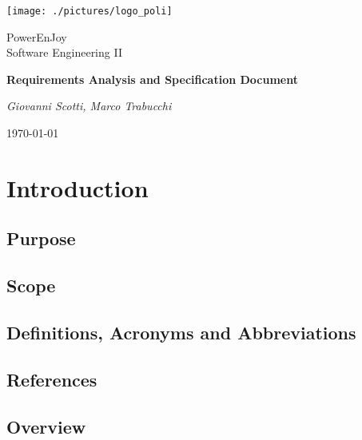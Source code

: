 \documentclass[a4paper,12pt]{report}
\begin{document}
\begin{titlepage}
\centering
\texttt{[image: ./pictures/logo\_poli]}\par
	\vspace{1.5cm}
	{\Large {PowerEnJoy \\ 
		Software Engineering II} \par}
	\vspace{1.5cm}
	{\LARGE \textbf{Requirements Analysis and Specification Document} \par}
	\vspace{1.5cm}
	{\Large\itshape Giovanni Scotti, Marco Trabucchi\par}
	\vspace{2cm}
	\vfill
	{\large \today \par}
\end{titlepage}

\tableofcontents

\chapter{Introduction}
\label{ch:Introduction}

\section{Purpose}


\section{Scope}


\section{Definitions, Acronyms and Abbreviations}


\section{References}


\section{Overview}

\end{document}
